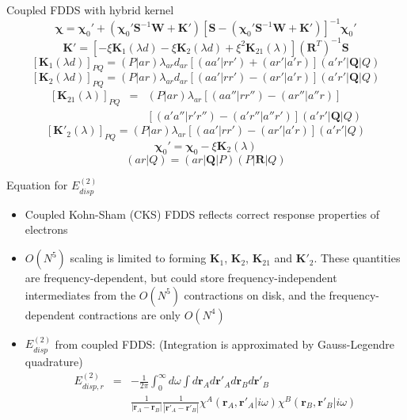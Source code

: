 \documentclass{beamer}
\begin{document}
        \begin{frame}{Coupled FDDS with hybrid kernel}
            $$\boldsymbol{\chi} = \boldsymbol{\chi}_0' + \left( \boldsymbol{\chi}_0' \mathbf{S}^{-1} \mathbf{W} + \mathbf{K}' \right) \left[ \mathbf{S} - \left( \boldsymbol{\chi}_0' \mathbf{S}^{-1} \mathbf{W} + \mathbf{K}' \right) \right]^{-1} \boldsymbol{\chi}_0'$$
            $$\mathbf{K}' = \left[ - \xi \mathbf{K}_1 \left( \lambda d\right) - \xi \mathbf{K}_2 \left( \lambda d\right) + \xi^2 \mathbf{K}_{21} \left( \lambda \right) \right] \left( \mathbf{R}^T \right)^{-1} \mathbf{S}$$
            $$[\mathbf{K}_1 (\lambda d)]_{PQ} = (P|ar) \lambda_{ar} d_{ar} [(aa'|rr')+(ar'|a'r)] (a'r'|\mathbf{Q}|Q)$$
            $$[\mathbf{K}_2 (\lambda d)]_{PQ} = (P|ar) \lambda_{ar} d_{ar} [(aa'|rr')-(ar'|a'r)] (a'r'|\mathbf{Q}|Q)$$
            \begin{eqnarray}
                \nonumber
                [\mathbf{K}_{21} (\lambda)]_{PQ} &=& (P|ar) \lambda_{ar} [(aa''|rr'')-(ar''|a''r)] \\ \nonumber
                & & [(a'a''|r'r'')-(a'r''|a''r')] (a'r'|\mathbf{Q}|Q)
            \end{eqnarray}
            $$[\mathbf{K}'_2 (\lambda)]_{PQ} = (P|ar) \lambda_{ar} [(aa'|rr')-(ar'|a'r)] (a'r'|Q)$$
            $$\boldsymbol{\chi}_0' = \boldsymbol{\chi}_0 - \xi \mathbf{K}_2 \left( \lambda \right)$$
            $$(ar|Q) = (ar|\mathbf{Q}|P)(P|\mathbf{R}|Q)$$
        \end{frame}

        \begin{frame}{Equation for $E_{disp}^{(2)}$}
            \begin{itemize}
                \item Coupled Kohn-Sham (CKS) FDDS reflects correct response properties of electrons
                \item $O(N^5)$ scaling is limited to forming $\mathbf{K}_1$, $\mathbf{K}_2$, $\mathbf{K}_{21}$ and $\mathbf{K}'_2$. These quantities are frequency-dependent, but could store frequency-independent intermediates from the $O(N^5)$ contractions on disk, and the frequency-dependent contractions are only $O(N^4)$
                \item $E_{disp}^{(2)}$ from coupled FDDS: (Integration is approximated by Gauss-Legendre quadrature)
                \begin{eqnarray}
                    \nonumber
                    E_{disp,r}^{(2)} &=& -\frac{1}{2\pi}\int_0^\infty d\omega \int d\mathbf{r}_A d\mathbf{r}'_A d\mathbf{r}_B d\mathbf{r}'_B \\ \nonumber
                    & & \frac{1}{|\mathbf{r}_A-\mathbf{r}_B|} \frac{1}{|\mathbf{r}'_A-\mathbf{r}'_B|} \chi^A\left(\mathbf{r}_A,\mathbf{r}'_A|i\omega\right)\chi^B\left(\mathbf{r}_B,\mathbf{r}'_B|i\omega\right)
                \end{eqnarray}
            \end{itemize}
        \end{frame}
        
\end{document}
